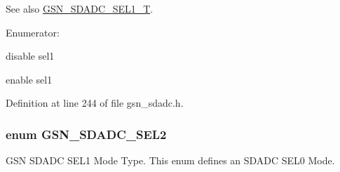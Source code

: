 \begin{DoxySeeAlso}{See also}
\hyperlink{a00652_ga851e1269993bbdc128b392fd7216ade7}{GSN\_\-SDADC\_\-SEL1\_\-T}. 
\end{DoxySeeAlso}
\begin{Desc}
\item[Enumerator: ]\par
\begin{description}
\item[{\em 
\hypertarget{a00652_gga7881f6f750388de2816384904fafac2aad040e5a10609b72d15f3f4ced9e108e1}{
GSN\_\-SDADC\_\-SEL1\_\-DISABLE}
\label{a00652_gga7881f6f750388de2816384904fafac2aad040e5a10609b72d15f3f4ced9e108e1}
}]disable sel1 \item[{\em 
\hypertarget{a00652_gga7881f6f750388de2816384904fafac2aa565a0e3706cba84eecf3e5beab847e22}{
GSN\_\-SDADC\_\-SEL1\_\-ENABLE}
\label{a00652_gga7881f6f750388de2816384904fafac2aa565a0e3706cba84eecf3e5beab847e22}
}]enable sel1 \end{description}
\end{Desc}



Definition at line 244 of file gsn\_\-sdadc.h.

\hypertarget{a00652_gad596a4cc54081bcce130d18d07fd701a}{
\subsubsection[{GSN\_\-SDADC\_\-SEL2}]{\setlength{\rightskip}{0pt plus 5cm}enum {\bf GSN\_\-SDADC\_\-SEL2}}}
\label{a00652_gad596a4cc54081bcce130d18d07fd701a}


GSN SDADC SEL1 Mode Type. This enum defines an SDADC SEL0 Mode. 

